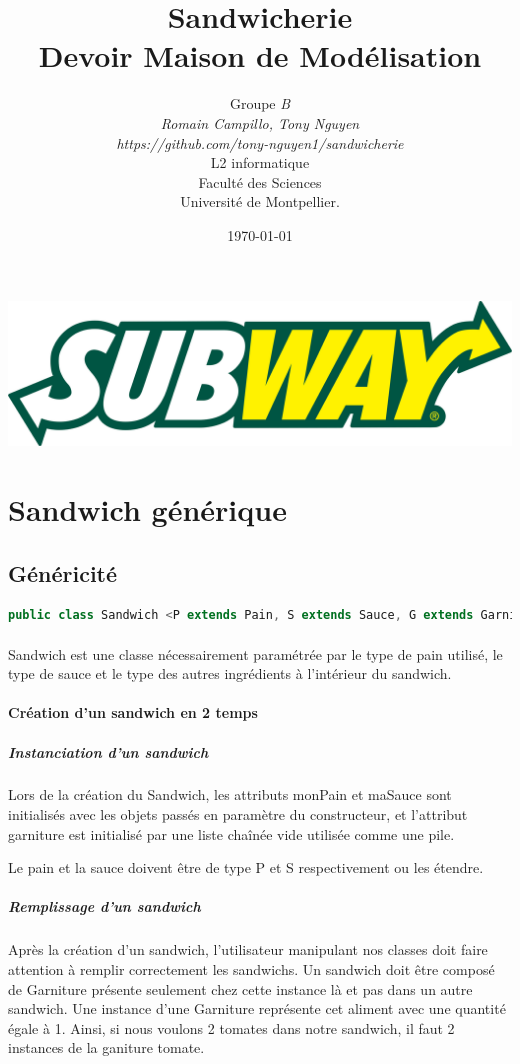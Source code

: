 \documentclass[a4paper]{article}
\title{Sandwicherie\\         %
Devoir Maison de Modélisation}
\author{Groupe \emph{B}\\
  \emph{Romain Campillo, Tony Nguyen}\\
  \emph{https://github.com/tony-nguyen1/sandwicherie}\\
  L2 informatique\\
  Faculté des Sciences\\
Université de Montpellier.}
\date{\today}
\begin{document}
\maketitle
\begin{center}
    \includegraphics[scale=0.09]{./logo.png}
\end{center}
\newpage
\tableofcontents
\clearpage
\section{Sandwich générique}
\subsection{Généricité}

\begin{lstlisting}[language=Java, caption=Entête de class Sandwich]
    public class Sandwich <P extends Pain, S extends Sauce, G extends Garniture>
\end{lstlisting}
\paragraph{}
Sandwich est une classe nécessairement paramétrée par le type de pain utilisé, le type de sauce et le type des autres ingrédients à l'intérieur du sandwich.

\paragraph{Création d'un sandwich en 2 temps}
\subparagraph{Instanciation d'un sandwich}
Lors de la création du Sandwich, les attributs monPain et maSauce sont initialisés avec les objets passés en paramètre du constructeur, et l’attribut garniture est initialisé par une liste chaînée vide utilisée comme une pile.

Le pain et la sauce doivent être de type P et S respectivement ou les étendre.

\subparagraph{Remplissage d'un sandwich}
Après la création d'un sandwich, l'utilisateur manipulant nos classes doit faire attention à remplir correctement les sandwichs. Un sandwich doit être composé de Garniture présente seulement chez cette instance là et pas dans un autre sandwich. Une instance d'une Garniture représente cet aliment avec une quantité égale à 1. Ainsi, si nous voulons 2 tomates dans notre sandwich, il faut 2 instances de la ganiture tomate.
\end{document}
